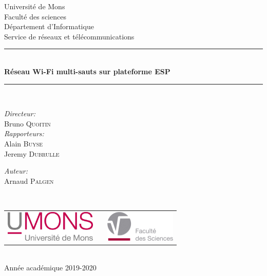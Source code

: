 \documentclass[a4paper, 12pt]{report}
\begin{document}
\begin{titlepage}
\begin{center}

{\Large Université de Mons}\\[1ex]
{\Large Faculté des sciences}\\[1ex]
{\Large Département d'Informatique}\\[1ex]
{\Large Service de réseaux et télécommunications}\\[2.5cm]

\newcommand{\HRule}{\rule{\linewidth}{0.3mm}}
\HRule \\[0.3cm]
{ \LARGE \bfseries Réseau Wi-Fi multi-sauts sur plateforme ESP \\[0.3cm]}
\HRule \\[1.5cm]

\begin{minipage}[t]{0.45\textwidth}
\begin{flushleft} \large
\emph{Directeur:}\\
Bruno \textsc{Quoitin}\\
\vspace{1.2cm}
\emph{Rapporteurs:}\\
Alain \textsc{Buyse}\\
Jeremy \textsc{Dubrulle}\\
\end{flushleft}
\end{minipage}
\begin{minipage}[t]{0.45\textwidth}
\begin{flushright} \large
\emph{Auteur:} \\
Arnaud \textsc{Palgen}
\end{flushright}
\end{minipage}\\[2ex]

\vfill

\begin{center}
\begin{tabular}[t]{c c c}
\includegraphics[height=1.5cm]{images/logoumons.jpg} &
\hspace{0.3cm} &
\includegraphics[height=1.5cm]{images/logofs.jpg}
\end{tabular}
\end{center}~\\
 
{\large Année académique 2019-2020}

\end{center}
\end{titlepage}
\end{document}
